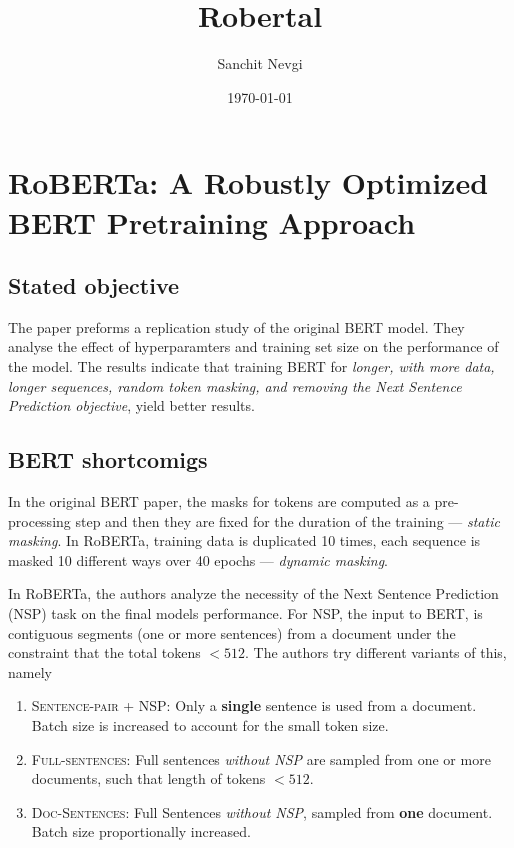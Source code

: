 \documentclass[12pt]{article}
\begin{document}
\title{\textbf{\huge{Robertal}}}

\date{\today}
\author{Sanchit Nevgi}

\section*{RoBERTa: A Robustly Optimized BERT Pretraining Approach}

\subsection*{Stated objective}
The paper preforms a replication study of the original BERT model. They analyse the effect of hyperparamters and training set size on the performance of the model. The results indicate that training BERT for \textit{longer, with more data, longer sequences, random token masking, and removing the Next Sentence Prediction objective}, yield better results.

\subsection*{BERT shortcomigs}

In the original BERT paper, the masks for tokens are computed as a pre-processing step and then they are fixed for the duration of the training --- \textit{static masking}. In RoBERTa, training data is duplicated 10 times, each sequence is masked 10 different ways over 40 epochs --- \textit{dynamic masking}.

In RoBERTa, the authors analyze the necessity of the Next Sentence Prediction (NSP) task on the final models performance. For NSP, the input to BERT, is contiguous segments (one or more sentences) from a document under the constraint that the total tokens $< 512$. The authors try different variants of this, namely

\begin{enumerate}
    \item \textsc{Sentence-pair + NSP}: Only a \textbf{single} sentence is used from a document. Batch size is increased to account for the small token size.
    \item \textsc{Full-sentences}: Full sentences \textit{without NSP} are sampled from one or more documents, such that length of tokens $< 512$.
    \item \textsc{Doc-Sentences}: Full Sentences \textit{without NSP}, sampled from \textbf{one} document. Batch size proportionally increased.
\end{enumerate}
\end{document}
